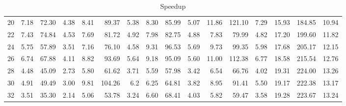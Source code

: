 \begin{table*}[ht]
\begin{tabular}{crrrrrrrrrrrrrrr}
 20  &  7.18 &  72.30 & 4.38 &  8.41 & 89.37  & 5.38 &  8.30  & 85.99  & 5.07 &  11.86 &  121.10 &  7.29  & 15.93 & 184.85 & 10.94\\
 22  &  7.43 &  74.84 & 4.53 &  7.69 & 81.72  & 4.92 &  7.98  & 82.75  & 4.88 &  7.83  &  79.99  &  4.82  & 17.20 & 199.60 & 11.82\\
 24  &  5.75 &  57.89 & 3.51 &  7.16 & 76.10  & 4.58 &  9.31  & 96.53  & 5.69 &  9.73  &  99.35  &  5.98  & 17.68 & 205.17 & 12.15\\
 26  &  6.74 &  67.88 & 4.11 &  8.82 & 93.69  & 5.64 &  9.18  & 95.09  & 5.60 &  11.00 &  112.38 &  6.77  & 18.58 & 215.54 & 12.76\\
 28  &  4.48 &  45.09 & 2.73 &  5.80 & 61.62  & 3.71 &  5.59  & 57.98  & 3.42 &  6.54  &  66.76  &  4.02  & 19.31 & 224.00 & 13.26\\
 30  &  4.91 &  49.49 & 3.00 &  9.81 & 104.26 & 6.2  &  6.25  & 64.81  & 3.82 &  8.95  &  91.41  &  5.50  & 19.17 & 222.38 & 13.17\\
 32  &  3.51 &  35.30 & 2.14 &  5.06 & 53.78  & 3.24 &  6.60  & 68.41  & 4.03 &  5.82  &  59.47  &  3.58  & 19.28 & 223.67 & 13.24\\
 \hline
\end{tabular}
\caption{Speedup}\label{tbl:speedup}
\end{table*}
























